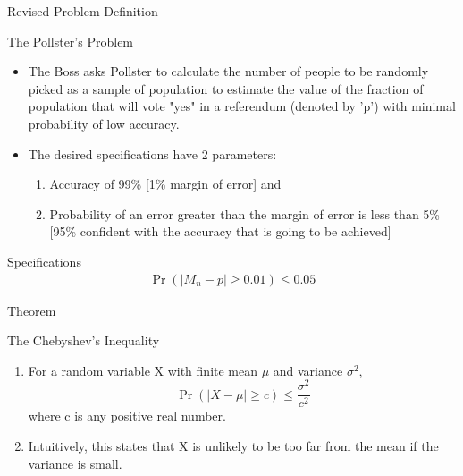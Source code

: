 \documentclass{beamer}
\providecommand{\abs}[1]{\vert#1\vert}
\providecommand{\pr}[1]{\ensuremath{\Pr\left(#1\right)}}
\begin{document}
\begin{frame}{Revised Problem Definition}
\begin{block}{The Pollster's Problem}
\begin{itemize}
    \item The Boss asks Pollster to calculate the number of people to be randomly picked as a sample of population to estimate the value of the fraction of population that will vote "yes" in a referendum (denoted by 'p') with minimal probability of low accuracy.
    \item The desired specifications have 2 parameters:
    \begin{enumerate}
        \item Accuracy of 99\% [1\% margin of error] and 
        \item Probability of an error greater than the margin of error is less than 5\% [95\% confident with the accuracy that is going to be achieved]
    \end{enumerate}
\end{itemize}
\end{block}
\begin{block}{Specifications}
\begin{align}
        \pr{\abs{M_n - p} \geq 0.01} \leq 0.05
    \end{align}
\end{block}
\end{frame}
\begin{frame}{Theorem}
\begin{block}{The Chebyshev's Inequality}
\begin{enumerate}
    \item For a random variable X with finite mean $\mu$ and variance $\sigma^2$,
    \begin{equation}
    \pr{\abs{X-\mu} \geq c} \leq \frac{\sigma^2}{c^2}
    \end{equation}
    where c is any positive real number.
    \item Intuitively, this states that X is unlikely to be too far from the mean if the variance is small.
\end{enumerate}
\end{block}    
\end{frame}
\end{document}
